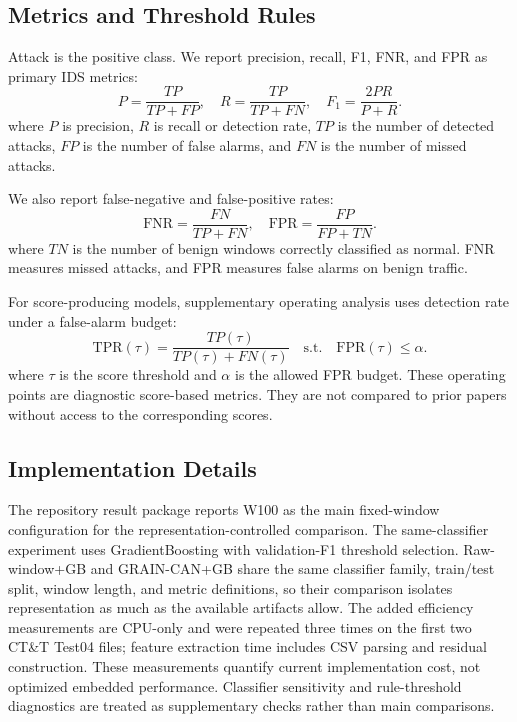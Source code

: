 \documentclass[runningheads]{llncs}
\newcommand{\method}{GRAIN-CAN}
\newcommand{\fpr}{\mathrm{FPR}}
\newcommand{\fnr}{\mathrm{FNR}}
\newcommand{\tpr}{\mathrm{TPR}}
\begin{document}
\subsection{Metrics and Threshold Rules}
Attack is the positive class. We report precision, recall, F1, FNR, and FPR as primary IDS metrics:
\begin{equation}
  P = \frac{TP}{TP+FP}, \quad
  R = \frac{TP}{TP+FN}, \quad
  F_1 = \frac{2PR}{P+R}.
\end{equation}
where \(P\) is precision, \(R\) is recall or detection rate, \(TP\) is the number of detected attacks, \(FP\) is the number of false alarms, and \(FN\) is the number of missed attacks.

We also report false-negative and false-positive rates:
\begin{equation}
  \fnr = \frac{FN}{TP+FN}, \quad
  \fpr = \frac{FP}{FP+TN}.
\end{equation}
where \(TN\) is the number of benign windows correctly classified as normal. FNR measures missed attacks, and FPR measures false alarms on benign traffic.

For score-producing models, supplementary operating analysis uses detection rate under a false-alarm budget:
\begin{equation}
  \tpr(\tau) = \frac{TP(\tau)}{TP(\tau)+FN(\tau)} \quad \text{s.t.} \quad \fpr(\tau) \leq \alpha.
\end{equation}
where \(\tau\) is the score threshold and \(\alpha\) is the allowed FPR budget. These operating points are diagnostic score-based metrics. They are not compared to prior papers without access to the corresponding scores.

\subsection{Implementation Details}
The repository result package reports W100 as the main fixed-window configuration for the representation-controlled comparison. The same-classifier experiment uses GradientBoosting with validation-F1 threshold selection. Raw-window+GB and \method{}+GB share the same classifier family, train/test split, window length, and metric definitions, so their comparison isolates representation as much as the available artifacts allow. The added efficiency measurements are CPU-only and were repeated three times on the first two CT\&T Test04 files; feature extraction time includes CSV parsing and residual construction. These measurements quantify current implementation cost, not optimized embedded performance. Classifier sensitivity and rule-threshold diagnostics are treated as supplementary checks rather than main comparisons.
\end{document}
